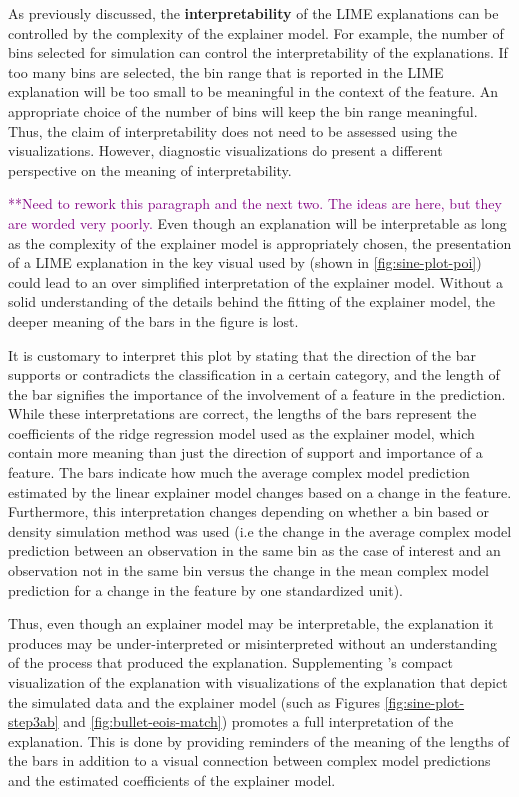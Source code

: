 \documentclass[AMS,STIX2COL]{WileyNJD-v2}\usepackage[]{graphicx}\usepackage[]{color}
\newcommand{\kgc}[1]{\textcolor{purple}{#1}}
\begin{document}
{As previously discussed, the \textbf{interpretability} of the LIME explanations can be controlled by the complexity of the explainer model. For example, the number of bins selected for simulation can control the interpretability of the explanations. If too many bins are selected, the bin range that is reported in the LIME explanation will be too small to be meaningful in the context of the feature. An appropriate choice of the number of bins will keep the bin range meaningful. Thus, the claim of interpretability does not need to be assessed using the visualizations. However, diagnostic visualizations do present a different perspective on the meaning of interpretability.

\kgc{**Need to rework this paragraph and the next two. The ideas are here, but they are worded very poorly.} Even though an explanation will be interpretable as long as the complexity of the explainer model is appropriately chosen, the presentation of a LIME explanation in the key visual used by \citep{ribeiro:2016} (shown in \autoref{fig:sine-plot-poi}) could lead to an over simplified interpretation of the explainer model. Without a solid understanding of the details behind the fitting of the explainer model, the deeper meaning of the bars in the figure is lost.

It is customary to interpret this plot by stating that the direction of the bar supports or contradicts the classification in a certain category, and the length of the bar signifies the importance of the involvement of a feature in the prediction. While these interpretations are correct, the lengths of the bars represent the coefficients of the ridge regression model used as the explainer model, which contain more meaning than just the direction of support and importance of a feature. The bars indicate how much the average complex model prediction estimated by the linear explainer model changes based on a change in the feature. Furthermore, this interpretation changes depending on whether a bin based or density simulation method was used (i.e the change in the average complex model prediction between an observation in the same bin as the case of interest and an observation not in the same bin versus the change in the mean complex model prediction for a change in the feature by one standardized unit).

Thus, even though an explainer model may be interpretable, the explanation it produces may be under-interpreted or misinterpreted without an understanding of the process that produced the explanation. Supplementing \citep{ribeiro:2016}'s compact visualization of the explanation with visualizations of the explanation that depict the simulated data and the explainer model (such as Figures \ref{fig:sine-plot-step3ab} and \ref{fig:bullet-eois-match}) promotes a full interpretation of the explanation. This is done by providing reminders of the meaning of the lengths of the bars in addition to a visual connection between complex model predictions and the estimated coefficients of the explainer model.

}
\end{document}
